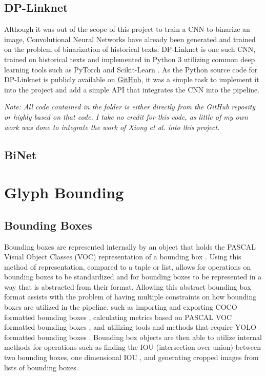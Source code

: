 \subsection{DP-Linknet}

Although it was out of the scope of this project to train a CNN to binarize an image, Convolutional Neural Networks have already been generated and trained on the problem of binarization of historical texts. DP-Linknet \cite{Xiong} is one such CNN, trained on historical texts and implemented in Python 3 utilizing common deep learning tools such as PyTorch \cite{PyTorch} and Scikit-Learn \cite{Scikit}. As the Python source code for DP-Linknet is publicly available on \href{https://github.com/beargolden/DP-LinkNet}{GitHub}, it was a simple task to implement it into the project and add a simple API that integrates the CNN into the pipeline.

\textit{Note: All code contained in the}  \textit{folder is either directly from the GitHub reposity or highly based on that code. I take no credit for this code, as little of my own work was done to integrate the work of Xiong et al. into this project.}

\subsection{BiNet}


\section{Glyph Bounding}

\subsection{Bounding Boxes}

Bounding boxes are represented internally by an object that holds the PASCAL Visual Object Classes (VOC) representation of a bounding box . Using this method of representation, compared to a tuple or list, allows for operations on bounding boxes to be standardized and for bounding boxes to be represented in a way that is abstracted from their format. Allowing this abstract bounding box format assists with the problem of having multiple constraints on how bounding boxes are utilized in the pipeline, such as importing and exporting COCO formatted bounding boxes , calculating metrics based on PASCAL VOC formatted bounding boxes , and utilizing tools and methods that require YOLO formatted bounding boxes . Bounding box objects are then able to utilize internal methods for operations such as finding the IOU (intersection over union)  between two bounding boxes, one dimensional IOU , and generating cropped images from lists of bounding boxes.

